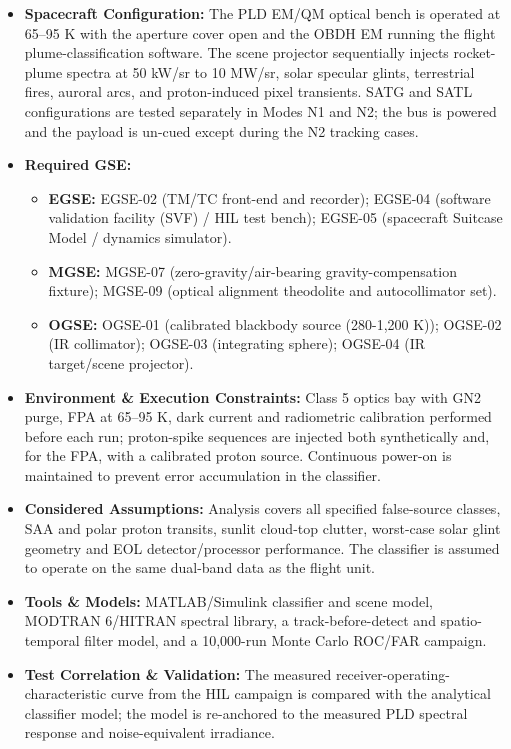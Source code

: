 \begin{itemize}
\item \textbf{Spacecraft Configuration:} The PLD EM/QM optical bench is operated at 65--95 K with the aperture cover open and the OBDH EM running the flight plume-classification software. The scene projector sequentially injects rocket-plume spectra at 50 kW/sr to 10 MW/sr, solar specular glints, terrestrial fires, auroral arcs, and proton-induced pixel transients. SATG and SATL configurations are tested separately in Modes N1 and N2; the bus is powered and the payload is un-cued except during the N2 tracking cases.
\item \textbf{Required GSE:}
\begin{itemize}
\item \textbf{EGSE:} EGSE-02 (TM/TC front-end and recorder); EGSE-04 (software validation facility (SVF) / HIL test bench); EGSE-05 (spacecraft Suitcase Model / dynamics simulator).
\item \textbf{MGSE:} MGSE-07 (zero-gravity/air-bearing gravity-compensation fixture); MGSE-09 (optical alignment theodolite and autocollimator set).
\item \textbf{OGSE:} OGSE-01 (calibrated blackbody source (280-1,200 K)); OGSE-02 (IR collimator); OGSE-03 (integrating sphere); OGSE-04 (IR target/scene projector).
\end{itemize}
\item \textbf{Environment \& Execution Constraints:} Class 5 optics bay with GN2 purge, FPA at 65--95 K, dark current and radiometric calibration performed before each run; proton-spike sequences are injected both synthetically and, for the FPA, with a calibrated proton source. Continuous power-on is maintained to prevent error accumulation in the classifier.
\item \textbf{Considered Assumptions:} Analysis covers all specified false-source classes, SAA and polar proton transits, sunlit cloud-top clutter, worst-case solar glint geometry and EOL detector/processor performance. The classifier is assumed to operate on the same dual-band data as the flight unit.
\item \textbf{Tools \& Models:} MATLAB/Simulink classifier and scene model, MODTRAN 6/HITRAN spectral library, a track-before-detect and spatio-temporal filter model, and a 10,000-run Monte Carlo ROC/FAR campaign.
\item \textbf{Test Correlation \& Validation:} The measured receiver-operating-characteristic curve from the HIL campaign is compared with the analytical classifier model; the model is re-anchored to the measured PLD spectral response and noise-equivalent irradiance.
\end{itemize}
